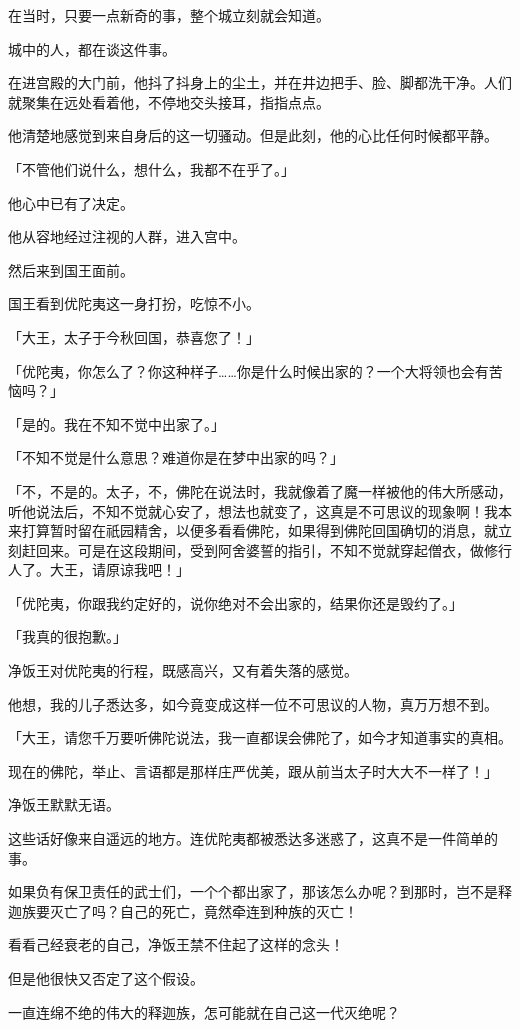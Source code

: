 \documentclass[twoside,openany]{book}
\begin{document}
在当时，只要一点新奇的事，整个城立刻就会知道。

城中的人，都在谈这件事。

在进宫殿的大门前，他抖了抖身上的尘土，并在井边把手、脸、脚都洗干净。人们就聚集在远处看着他，不停地交头接耳，指指点点。

他清楚地感觉到来自身后的这一切骚动。但是此刻，他的心比任何时候都平静。

「不管他们说什么，想什么，我都不在乎了。」

他心中已有了决定。

他从容地经过注视的人群，进入宫中。

然后来到国王面前。

国王看到优陀夷这一身打扮，吃惊不小。

「大王，太子于今秋回国，恭喜您了！」

「优陀夷，你怎么了？你这种样子……你是什么时候出家的？一个大将领也会有苦恼吗？」

「是的。我在不知不觉中出家了。」

「不知不觉是什么意思？难道你是在梦中出家的吗？」

「不，不是的。太子，不，佛陀在说法时，我就像着了魔一样被他的伟大所感动，听他说法后，不知不觉就心安了，想法也就变了，这真是不可思议的现象啊！我本来打算暂时留在祇园精舍，以便多看看佛陀，如果得到佛陀回国确切的消息，就立刻赶回来。可是在这段期间，受到阿舍婆誓的指引，不知不觉就穿起僧衣，做修行人了。大王，请原谅我吧！」

「优陀夷，你跟我约定好的，说你绝对不会出家的，结果你还是毁约了。」

「我真的很抱歉。」

净饭王对优陀夷的行程，既感高兴，又有着失落的感觉。

他想，我的儿子悉达多，如今竟变成这样一位不可思议的人物，真万万想不到。

「大王，请您千万要听佛陀说法，我一直都误会佛陀了，如今才知道事实的真相。

现在的佛陀，举止、言语都是那样庄严优美，跟从前当太子时大大不一样了！」

净饭王默默无语。

这些话好像来自遥远的地方。连优陀夷都被悉达多迷惑了，这真不是一件简单的事。

如果负有保卫责任的武士们，一个个都出家了，那该怎么办呢？到那时，岂不是释迦族要灭亡了吗？自己的死亡，竟然牵连到种族的灭亡！

看看己经衰老的自己，净饭王禁不住起了这样的念头！

但是他很快又否定了这个假设。

一直连绵不绝的伟大的释迦族，怎可能就在自己这一代灭绝呢？
\end{document}
